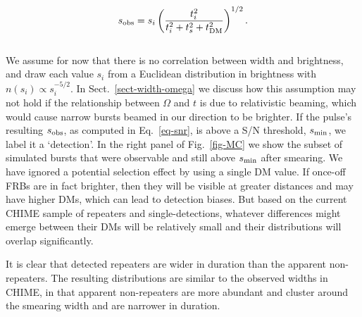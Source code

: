 \documentclass[fleqn,usenatbib]{mnras}
\begin{document}
\begin{equation}
    \label{eq-snr}
    s_{\rm obs} = s_i \left ( \frac{t^2_i}{t^2_i + t^2_s + t^2_{\rm DM}} \right )^{1/2}.
\end{equation}
\\
\noindent We assume for now that there is no correlation between width and 
brightness, and draw each value $s_i$ from a Euclidean distribution in brightness
with $n(s_i)\propto s^{-5/2}_i$. In Sect.~\ref{sect-width-omega} we discuss 
how this assumption may not hold if the relationship between $\Omega$ and $t$ 
is due to relativistic beaming, which would cause narrow bursts beamed in our 
direction to be brighter. 
If the pulse's resulting $s_{\rm obs}$, as computed in Eq.~\ref{eq-snr}, is above a S/N threshold,  $s_{\rm min}$, we 
label it a `detection'. In the right panel of Fig.~\ref{fig-MC} we show the
subset of simulated bursts that were observable and still above $s_{\rm min}$ after smearing. We have ignored a 
potential selection effect by using a single DM value. 
If once-off FRBs are in fact brighter, then they will be visible at 
greater distances and may have higher DMs, which can lead to 
detection biases. But based on the current 
CHIME sample of repeaters and 
single-detections, whatever differences might emerge between 
their DMs will be relatively small and their distributions 
will overlap significantly.

It is clear that 
detected repeaters are wider in duration than the apparent non-repeaters. The resulting distributions are similar to the observed widths in CHIME, in that apparent non-repeaters 
are more abundant and cluster around the smearing width
and are narrower in duration.
\end{document}
